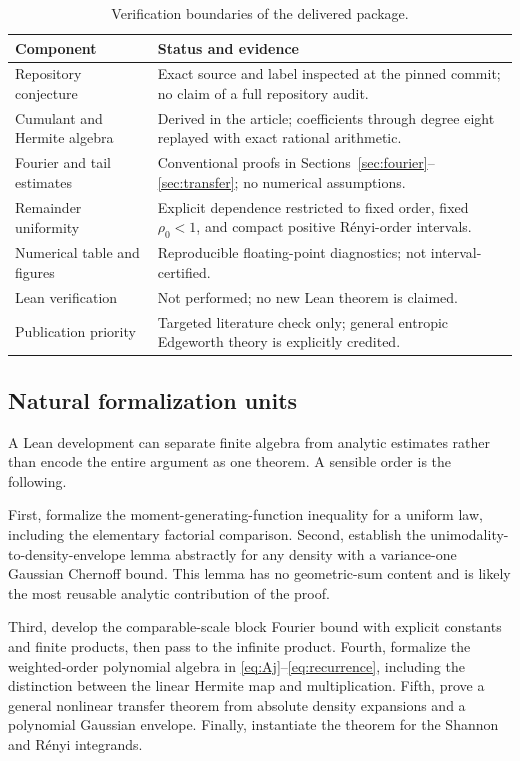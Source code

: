 \documentclass[11pt,a4paper]{article}
\numberwithin{equation}{section}
\theoremstyle{definition}
\theoremstyle{remark}
\begin{document}
\begin{table}[htbp]
\centering
\small
\caption{Verification boundaries of the delivered package.}
\begin{tabular}{@{}p{}p{}@{}}
\toprule
Component & Status and evidence\\
\midrule
Repository conjecture & Exact source and label inspected at the pinned commit; no claim of a full repository audit.\\
Cumulant and Hermite algebra & Derived in the article; coefficients through degree eight replayed with exact rational arithmetic.\\
Fourier and tail estimates & Conventional proofs in Sections~\ref{sec:fourier}--\ref{sec:transfer}; no numerical assumptions.\\
Remainder uniformity & Explicit dependence restricted to fixed order, fixed $\rho_0<1$, and compact positive R\'enyi-order intervals.\\
Numerical table and figures & Reproducible floating-point diagnostics; not interval-certified.\\
Lean verification & Not performed; no new Lean theorem is claimed.\\
Publication priority & Targeted literature check only; general entropic Edgeworth theory is explicitly credited.\\
\bottomrule
\end{tabular}
\end{table}

\subsection{Natural formalization units}

A Lean development can separate finite algebra from analytic estimates rather
than encode the entire argument as one theorem. A sensible order is the
following.

First, formalize the moment-generating-function inequality for a uniform law,
including the elementary factorial comparison. Second, establish the
unimodality-to-density-envelope lemma abstractly for any density with a
variance-one Gaussian Chernoff bound. This lemma has no geometric-sum content
and is likely the most reusable analytic contribution of the proof.

Third, develop the comparable-scale block Fourier bound with explicit
constants and finite products, then pass to the infinite product. Fourth,
formalize the weighted-order polynomial algebra in
\eqref{eq:Aj}--\eqref{eq:recurrence}, including the distinction between the
linear Hermite map and multiplication. Fifth, prove a general nonlinear
transfer theorem from absolute density expansions and a polynomial Gaussian
envelope. Finally, instantiate the theorem for the Shannon and R\'enyi
integrands.
\end{document}

